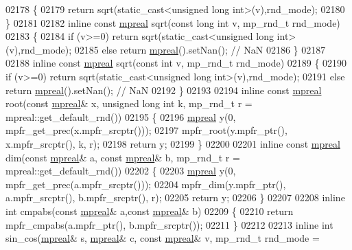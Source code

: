 \begin{DoxyCode}
{{02178 \{
02179     \textcolor{keywordflow}{return} sqrt(static\_cast<unsigned long int>(v),rnd\_mode);
02180 \}
02181 
02182 \textcolor{keyword}{inline} \textcolor{keyword}{const} \hyperlink{classmpfr_1_1mpreal}{mpreal} sqrt(\textcolor{keyword}{const} \textcolor{keywordtype}{long} \textcolor{keywordtype}{int} v, mp\_rnd\_t rnd\_mode)
02183 \{
02184     \textcolor{keywordflow}{if} (v>=0)   \textcolor{keywordflow}{return} sqrt(static\_cast<unsigned long int>(v),rnd\_mode);
02185     \textcolor{keywordflow}{else}        \textcolor{keywordflow}{return} \hyperlink{classmpfr_1_1mpreal}{mpreal}().setNan(); \textcolor{comment}{// NaN}
02186 \}
02187 
02188 \textcolor{keyword}{inline} \textcolor{keyword}{const} \hyperlink{classmpfr_1_1mpreal}{mpreal} sqrt(\textcolor{keyword}{const} \textcolor{keywordtype}{int} v, mp\_rnd\_t rnd\_mode)
02189 \{
02190     \textcolor{keywordflow}{if} (v>=0)   \textcolor{keywordflow}{return} sqrt(static\_cast<unsigned long int>(v),rnd\_mode);
02191     \textcolor{keywordflow}{else}        \textcolor{keywordflow}{return} \hyperlink{classmpfr_1_1mpreal}{mpreal}().setNan(); \textcolor{comment}{// NaN}
02192 \}
02193 
02194 \textcolor{keyword}{inline} \textcolor{keyword}{const} \hyperlink{classmpfr_1_1mpreal}{mpreal} root(\textcolor{keyword}{const} \hyperlink{classmpfr_1_1mpreal}{mpreal}& x, \textcolor{keywordtype}{unsigned} \textcolor{keywordtype}{long} \textcolor{keywordtype}{int} k, mp\_rnd\_t r = 
      mpreal::get\_default\_rnd())
02195 \{
02196     \hyperlink{classmpfr_1_1mpreal}{mpreal} y(0, mpfr\_get\_prec(x.mpfr\_srcptr()));
02197     mpfr\_root(y.mpfr\_ptr(), x.mpfr\_srcptr(), k, r);
02198     \textcolor{keywordflow}{return} y;
02199 \}
02200 
02201 \textcolor{keyword}{inline} \textcolor{keyword}{const} \hyperlink{classmpfr_1_1mpreal}{mpreal} dim(\textcolor{keyword}{const} \hyperlink{classmpfr_1_1mpreal}{mpreal}& a, \textcolor{keyword}{const} \hyperlink{classmpfr_1_1mpreal}{mpreal}& b, mp\_rnd\_t r = 
      mpreal::get\_default\_rnd())
02202 \{
02203     \hyperlink{classmpfr_1_1mpreal}{mpreal} y(0, mpfr\_get\_prec(a.mpfr\_srcptr()));
02204     mpfr\_dim(y.mpfr\_ptr(), a.mpfr\_srcptr(), b.mpfr\_srcptr(), r);
02205     \textcolor{keywordflow}{return} y;
02206 \}
02207 
02208 \textcolor{keyword}{inline} \textcolor{keywordtype}{int} cmpabs(\textcolor{keyword}{const} \hyperlink{classmpfr_1_1mpreal}{mpreal}& a,\textcolor{keyword}{const} \hyperlink{classmpfr_1_1mpreal}{mpreal}& b)
02209 \{
02210     \textcolor{keywordflow}{return} mpfr\_cmpabs(a.mpfr\_ptr(), b.mpfr\_srcptr());
02211 \}
02212 
02213 \textcolor{keyword}{inline} \textcolor{keywordtype}{int} sin\_cos(\hyperlink{classmpfr_1_1mpreal}{mpreal}& s, \hyperlink{classmpfr_1_1mpreal}{mpreal}& c, \textcolor{keyword}{const} \hyperlink{classmpfr_1_1mpreal}{mpreal}& v, mp\_rnd\_t rnd\_mode = 
}}
\end{DoxyCode}
